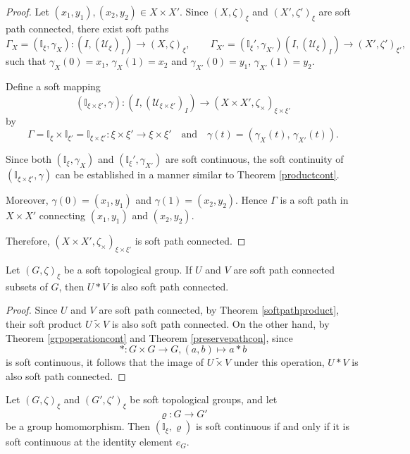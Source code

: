 \documentclass[preprint,12pt]{elsarticle}
\begin{document}
\begin{proof}
Let $(x_1,y_1),(x_2,y_2)\in X\times X'$.
Since $(X,\zeta)_\xi$ and $(X',\zeta')_{\xi}$ are soft path connected, there exist soft paths
\[
\Gamma_X=(\mathbb{I}_\xi,\gamma_X):(I,(\mathscr{U}_{\xi})_{I})\to (X, \zeta)_ \xi,
\qquad
\Gamma_{X'}=(\mathbb{I}_\xi',\gamma_{X'})(I,(\mathscr{U}_{\xi})_{I})\to (X', \zeta')_ {\xi'},
\]
such that $\gamma_X(0)=x_1$, $\gamma_X(1)=x_2$ and $\gamma_{X'}(0)=y_1$, $\gamma_{X'}(1)=y_2$.

Define a soft mapping
\[
(\mathbb{I}_{\xi\times \xi'},\gamma):(I,(\mathscr{U}_{\xi\times \xi'})_{I})\to (X\times X', \zeta_\times)_ {\xi\times \xi'}
\]
by
\[
\Gamma=\mathbb{I}_\xi\times \mathbb{I}_{\xi'}=\mathbb{I}_{\xi\times \xi'}: \xi\times \xi'\to \xi\times \xi'\quad \text{and} \quad \gamma(t)=(\gamma_X(t),\,\gamma_{X'}(t)).
\]

Since both $(\mathbb{I}_\xi,\gamma_X)$ and $(\mathbb{I}_\xi',\gamma_{X'})$ are soft continuous,
the soft continuity of $(\mathbb{I}_{\xi\times \xi'},\gamma)$ can be established in a manner similar to Theorem \ref{productcont}.

Moreover, $\gamma(0)=(x_1,y_1)$ and $\gamma(1)=(x_2,y_2)$.
Hence $\Gamma$ is a soft path in $X\times X'$ connecting $(x_1,y_1)$ and $(x_2,y_2)$.

Therefore, $(X\times X',\zeta_\times )_{\xi\times \xi'}$ is soft path connected.
\end{proof}


\begin{thm}
Let \( (G,\zeta)_\xi  \) be a soft topological group. If $U$ and $V$ are soft path connected subsets of $G$, then $U\ast V$ is also soft path connected.

\end{thm}


\begin{proof}
Since $U$ and $V$ are soft path connected, by Theorem \ref{softpathproduct}, their soft product $U\widetilde{\times} V$ is also soft path connected. On the other hand, by Theorem \ref{grpoperationcont} and Theorem \ref{preservepathcon}, since \[\ast\colon G\times G\to G, (a,b)\mapsto a\ast b\] is soft continuous, it follows that the image of  $U\widetilde{\times} V$ under this operation,  $U\ast V$
is also soft path connected.
\end{proof}

\begin{thm}
Let $(G,\zeta)_\xi $ and $(G',\zeta')_{\xi} $ be soft topological groups, and let
\[
\varrho\colon G\to G'
\]
be a group homomorphism.
Then $(\mathbb{I}_\xi,\varrho)$ is soft continuous if and only if it is soft continuous at the identity element $e_G$.
\end{thm}
\end{document}
